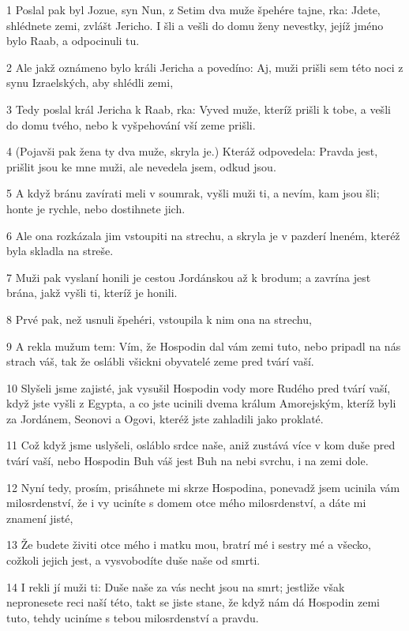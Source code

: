 \par 1 Poslal pak byl Jozue, syn Nun, z Setim dva muže špehére tajne, rka: Jdete, shlédnete zemi, zvlášt Jericho. I šli a vešli do domu ženy nevestky, jejíž jméno bylo Raab, a odpocinuli tu.
\par 2 Ale jakž oznámeno bylo králi Jericha a povedíno: Aj, muži prišli sem této noci z synu Izraelských, aby shlédli zemi,
\par 3 Tedy poslal král Jericha k Raab, rka: Vyved muže, kteríž prišli k tobe, a vešli do domu tvého, nebo k vyšpehování vší zeme prišli.
\par 4 (Pojavši pak žena ty dva muže, skryla je.) Kteráž odpovedela: Pravda jest, prišlit jsou ke mne muži, ale nevedela jsem, odkud jsou.
\par 5 A když bránu zavírati meli v soumrak, vyšli muži ti, a nevím, kam jsou šli; honte je rychle, nebo dostihnete jich.
\par 6 Ale ona rozkázala jim vstoupiti na strechu, a skryla je v pazderí lneném, kteréž byla skladla na streše.
\par 7 Muži pak vyslaní honili je cestou Jordánskou až k brodum; a zavrína jest brána, jakž vyšli ti, kteríž je honili.
\par 8 Prvé pak, než usnuli špehéri, vstoupila k nim ona na strechu,
\par 9 A rekla mužum tem: Vím, že Hospodin dal vám zemi tuto, nebo pripadl na nás strach váš, tak že oslábli všickni obyvatelé zeme pred tvárí vaší.
\par 10 Slyšeli jsme zajisté, jak vysušil Hospodin vody more Rudého pred tvárí vaší, když jste vyšli z Egypta, a co jste ucinili dvema králum Amorejským, kteríž byli za Jordánem, Seonovi a Ogovi, kteréž jste zahladili jako proklaté.
\par 11 Což když jsme uslyšeli, osláblo srdce naše, aniž zustává více v kom duše pred tvárí vaší, nebo Hospodin Buh váš jest Buh na nebi svrchu, i na zemi dole.
\par 12 Nyní tedy, prosím, prisáhnete mi skrze Hospodina, ponevadž jsem ucinila vám milosrdenství, že i vy uciníte s domem otce mého milosrdenství, a dáte mi znamení jisté,
\par 13 Že budete živiti otce mého i matku mou, bratrí mé i sestry mé a všecko, cožkoli jejich jest, a vysvobodíte duše naše od smrti.
\par 14 I rekli jí muži ti: Duše naše za vás necht jsou na smrt; jestliže však nepronesete reci naší této, takt se jiste stane, že když nám dá Hospodin zemi tuto, tehdy uciníme s tebou milosrdenství a pravdu.
